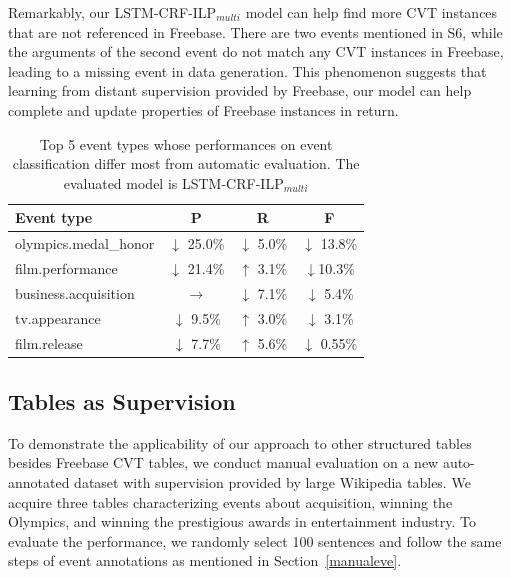 Remarkably, our LSTM-CRF-ILP$_{multi}$ model can help find more CVT instances that are not referenced in Freebase. There are two events mentioned in S6, while the arguments of the second event do not match any CVT instances in Freebase, leading to a missing event in data generation. This phenomenon suggests that learning from distant supervision provided by Freebase, our model can help complete and update properties of Freebase instances in return.

\begin{table}[h]
\small
\centering
\begin{tabular}{|l|c|c|c|} \hline
	Event type & P & R & F \\ \hline
	olympics.medal\_honor%
	& $\downarrow$ 25.0\% & $\downarrow$ 5.0\% & $\downarrow$ 13.8\% \\ \hline
	film.performance & $\downarrow$ 21.4\% & $\uparrow$ 3.1\% & $\downarrow$10.3\% \\ \hline
	business.acquisition & $\rightarrow$ & $\downarrow$ 7.1\% & $\downarrow$ 5.4\% \\ \hline
	tv.appearance%
	& $\downarrow$ 9.5\% & $\uparrow$ 3.0\% & $\downarrow$ 3.1\% \\ \hline
	film.release%
	& $\downarrow$ 7.7\% & $\uparrow$ 5.6\% & $\downarrow$ 0.55\% \\ \hline
\end{tabular}
\caption{Top 5 event types whose performances on event classification differ most from automatic evaluation. The evaluated model is LSTM-CRF-ILP$_{multi}$ \label{tab:4}}
\end{table}

\subsection{Tables as Supervision}
To demonstrate the applicability of our approach to other structured tables besides Freebase CVT tables, we conduct manual evaluation on a new auto-annotated dataset with supervision provided by large Wikipedia tables. We acquire three tables characterizing events about acquisition, winning the Olympics, and winning the prestigious awards in entertainment industry. To evaluate the performance, we randomly select 100 sentences and follow the same steps of event annotations as mentioned in Section~\ref{manualeve}. 

